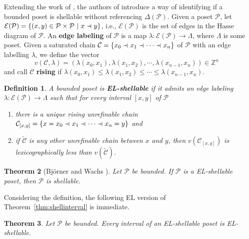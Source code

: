 \documentclass[letterpaper,10pt]{article}
\newtheorem{theorem}{Theorem}
\newtheorem{definition}[theorem]{Definition}
\newcommand{\precdot}{\prec\mathrel{\mkern-5mu}\mathrel{\cdot}}
\begin{document}
Extending the work of \textbf{\cite{Bjorner,BW1,BW2}}, the authors of \textbf{\cite{npshell,npshell2}} introduce a way of identifying if a bounded poset is shellable without referencing $\Delta(\mathcal{P})$. Given a poset $\mathcal{P}$, let $\mathcal{E}(\mathcal{P})=\{(x,y)\in\mathcal{P}\times\mathcal{P}~|~x\precdot y\}$, i.e., $\mathcal{E}(\mathcal{P})$ is the set of edges in the Hasse diagram of $\mathcal{P}$. An \textbf{edge labeling} of $\mathcal{P}$ is a map $\lambda:\mathcal{E}(\mathcal{P})\to\Lambda$, where $\Lambda$ is some poset. Given a saturated chain $\mathcal{C}=\{x_0\precdot x_1\precdot\cdots\precdot x_n\}$ of $\mathcal{P}$ with an edge labelling $\lambda$, we define the vector $$v(\mathcal{C},\lambda)=(\lambda(x_0,x_1),\lambda(x_1,x_2),\cdots, \lambda(x_{n-1},x_n))\in\mathbb{Z}^n$$ and call $\mathcal{C}$ \textbf{rising} if $\lambda(x_0,x_1)\le\lambda(x_1,x_2)\le\cdots\le \lambda(x_{n-1},x_n)$.

\begin{definition}\label{def:EL}
    A bounded poset is \textbf{EL-shellable} if it admits an edge labeling $\lambda:\mathcal{E}(\mathcal{P})\to \Lambda$ such that for every interval $[x,y]$ of $\mathcal{P}$
    \begin{enumerate}
        \item[\textup{1)}] there is a unique rising unrefinable chain $\mathcal{C}_{[x,y]}=\{x=x_0\precdot x_1\precdot\cdots\precdot x_n=y\}$ and
        \item[\textup{2)}] if $\widetilde{\mathcal{C}}$ is any other unrefinable chain between $x$ and $y$, then $v(\mathcal{C}_{[x,y]})$ is lexicographically less than $v\left(\widetilde{\mathcal{C}}\right)$.
       
    \end{enumerate}
\end{definition}


\begin{theorem}[Bj\"orner and Wachs \textbf{\cite{npshell}}]\label{thm:ELshell}
    Let $\mathcal{P}$ be bounded. If $\mathcal{P}$ is a EL-shellable poset, then $\mathcal{P}$ is shellable.
\end{theorem}

Considering the definition, the following EL version of Theorem~\ref{thm:shellinterval} is immediate.

\begin{theorem}\label{thm:ELinterval}
Let $\mathcal{P}$ be bounded. Every interval of an EL-shellable poset is EL-shellable.
\end{theorem}
\end{document}
